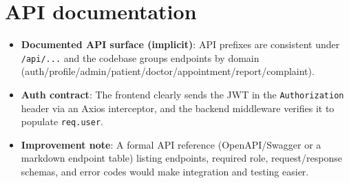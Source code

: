\documentclass[12pt,a4paper]{article}
\begin{document}
\section{API documentation}
\begin{itemize}[leftmargin=*, itemsep=0.4em]
  \item \textbf{Documented API surface (implicit)}: API prefixes are consistent under \texttt{/api/...} and the codebase groups endpoints by domain (auth/profile/admin/patient/doctor/appointment/report/complaint).
  \item \textbf{Auth contract}: The frontend clearly sends the JWT in the \texttt{Authorization} header via an Axios interceptor, and the backend middleware verifies it to populate \texttt{req.user}.
  \item \textbf{Improvement note}: A formal API reference (OpenAPI/Swagger or a markdown endpoint table) listing endpoints, required role, request/response schemas, and error codes would make integration and testing easier.
\end{itemize}
\end{document}
